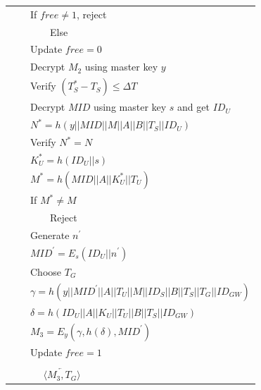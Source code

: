 \documentclass[a4paper,12pt]{report}
\begin{document}
\begin{figure}
\begin{center}
{\begin{tabular}{|l l l|}
                               &                       & If $free\neq 1$, reject \\
                               &                       &~~~~Else \\
                               &                       & Update $free = 0$\\
                               &                       & Decrypt $M_2$ using master key $y$\\
                               &                       & Verify $(T_{S}^* - T_S)\leq \Delta T$\\
                               &                       & Decrypt $MID$ using master key $s$ and get $ID_U$\\
                               &                       & $N^* = h(y||MID||M||A||B||T_S||ID_U)$\\
                               &                       & Verify $N^* = N$\\
                               &                       & $K_U^* = h( ID_U||s)$\\
                               &                       & $M^* = h(MID || A ||K_U^{*}||T_U)$\\
                               &                       & If $M^* \neq M$ \\
                               &                       & ~~~~Reject \\
                               &                       & Generate $n^{\prime}$\\
                               &                       & $MID^{\prime} = E_{s}(ID_U||n^{\prime})$\\
                               &                       & Choose $T_G$\\
                               &                       & $\gamma = h(y||MID^{\prime}||A||T_U||M||ID_S||B||T_S||T_G||ID_{GW})$\\
                               &                       & $\delta = h(ID_U||A||K_U|| T_U ||B||T_S||ID_{GW})$\\
                               &                       & $M_3= E_y(\gamma, h(\delta ), MID^{\prime})$\\
                               &                       & Update $free = 1$\\
&&\\
                               && $\underleftarrow{~~~~~~\langle M_3,T_{G} \rangle~~~~~~}$ \\

\end{tabular}}
\end{center}
\end{figure}
\end{document}
